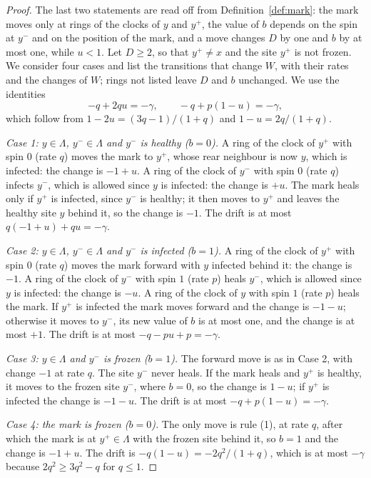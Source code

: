 \documentclass[11pt]{amsart}
\theoremstyle{definition}
\theoremstyle{remark}
\begin{document}
\begin{proof}
The last two statements are read off from Definition~\ref{def:mark}: the mark moves only at rings of the clocks of $y$ and
$y^+$, the value of $b$ depends on the spin at $y^-$ and on the position of the mark, and a move changes $D$ by one and $b$
by at most one, while $u<1$. Let $D\ge2$, so that $y^+\ne x$ and the site $y^+$ is not frozen. We consider four cases and
list the transitions that change $W$, with their rates and the changes of $W$; rings not listed leave $D$ and $b$
unchanged. We use the identities
\[
-q+2qu=-\gamma,\qquad -q+p(1-u)=-\gamma,
\]
which follow from $1-2u=(3q-1)/(1+q)$ and $1-u=2q/(1+q)$.

\emph{Case 1: $y\in\Lambda$, $y^-\in\Lambda$ and $y^-$ is healthy ($b=0$).} A ring of the clock of $y^+$ with spin $0$
(rate $q$) moves the mark to $y^+$, whose rear neighbour is now $y$, which is infected: the change is $-1+u$. A ring of
the clock of $y^-$ with spin $0$ (rate $q$) infects $y^-$, which is allowed since $y$ is infected: the change is $+u$.
The mark heals only if $y^+$ is infected, since $y^-$ is healthy; it then moves to $y^+$ and leaves the healthy site $y$
behind it, so the change is $-1$. The drift is at most $q(-1+u)+qu=-\gamma$.

\emph{Case 2: $y\in\Lambda$, $y^-\in\Lambda$ and $y^-$ is infected ($b=1$).} A ring of the clock of $y^+$ with spin $0$
(rate $q$) moves the mark forward with $y$ infected behind it: the change is $-1$. A ring of the clock of $y^-$ with spin
$1$ (rate $p$) heals $y^-$, which is allowed since $y$ is infected: the change is $-u$. A ring of the clock of $y$ with
spin $1$ (rate $p$) heals the mark. If $y^+$ is infected the mark moves forward and the change is $-1-u$; otherwise it
moves to $y^-$, its new value of $b$ is at most one, and the change is at most $+1$. The drift is at most
$-q-pu+p=-\gamma$.

\emph{Case 3: $y\in\Lambda$ and $y^-$ is frozen ($b=1$).} The forward move is as in Case 2, with change $-1$ at rate $q$.
The site $y^-$ never heals. If the mark heals and $y^+$ is healthy, it moves to the frozen site $y^-$, where $b=0$, so the
change is $1-u$; if $y^+$ is infected the change is $-1-u$. The drift is at most $-q+p(1-u)=-\gamma$.

\emph{Case 4: the mark is frozen ($b=0$).} The only move is rule (1), at rate $q$, after which the mark is at $y^+\in
\Lambda$ with the frozen site behind it, so $b=1$ and the change is $-1+u$. The drift is $-q(1-u)=-2q^2/(1+q)$, which is
at most $-\gamma$ because $2q^2\ge3q^2-q$ for $q\le1$.
\end{proof}
\end{document}
